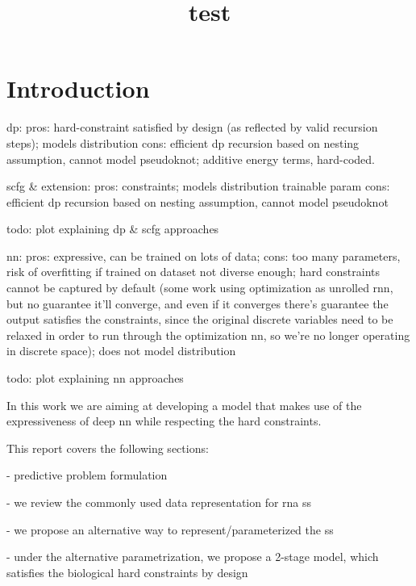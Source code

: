 \documentclass{article}
\title{test}
\begin{document}
\maketitle



\section{Introduction}

dp:
pros: hard-constraint satisfied by design (as reflected by valid recursion steps);
models distribution
cons: efficient dp recursion based on nesting assumption, cannot model pseudoknot;
additive energy terms, hard-coded.

scfg & extension:
pros: constraints;
models distribution
trainable param
cons: efficient dp recursion based on nesting assumption, cannot model pseudoknot


todo: plot explaining dp & scfg approaches

nn:
pros: expressive, can be trained on lots of data;
cons: too many parameters, risk of overfitting if trained on dataset not diverse enough;
hard constraints cannot be captured by default
(some work using optimization as unrolled rnn, but no guarantee it'll converge,
and even if it converges there's guarantee the output satisfies the constraints,
since the original discrete variables need to be relaxed in order to run through the optimization nn,
so we're no longer operating in discrete space);
does not model distribution

todo: plot explaining nn approaches


In this work we are aiming at developing a model that makes use of the expressiveness of deep nn
while respecting the hard constraints.

This report covers the following sections:

- predictive problem formulation

- we review the commonly used data representation for rna ss

- we propose an alternative way to represent/parameterized the ss

- under the alternative parametrization, we propose a 2-stage model,
which satisfies the biological hard constraints by design
\end{document}

